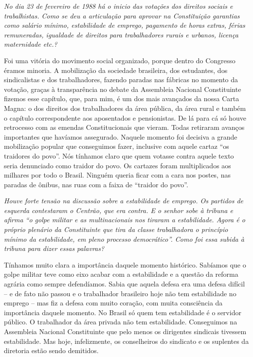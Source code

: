 \medskip

\noindent\emph{No dia 23 de fevereiro de 1988 há o inicio das votações dos
direitos sociais e trabalhistas. Como se deu a articulação para aprovar
na Constituição garantias como salário mínimo, estabilidade de emprego,
pagamento de horas extras, férias remuneradas, igualdade de direitos
para trabalhadores rurais e urbanos, licença maternidade etc.?}

Foi uma vitória do movimento social organizado, porque
dentro do Congresso éramos minoria. A mobilização da sociedade
brasileira, dos estudantes, dos sindicalistas e dos trabalhadores,
fazendo paradas nas fábricas no momento da votação, graças à
transparência no debate da Assembleia Nacional Constituinte fizemos esse
capítulo, que, para mim, é um dos mais avançados da nossa Carta Magna: o
dos direitos dos trabalhadores da área pública, da área rural e também o
capítulo correspondente aos aposentados e pensionistas. De lá para cá só
houve retrocesso com as emendas Constitucionais que vieram. Todas
retiraram avanços importantes que havíamos assegurado. Naquele momento
foi decisiva a grande mobilização popular que conseguimos fazer,
inclusive com aquele cartaz ``os traidores do povo''. Nós tínhamos claro
que quem votasse contra aquele texto seria denunciado como traidor do
povo. Os cartazes foram multiplicados aos milhares por todo o Brasil.
Ninguém queria ficar com a cara nos postes, nas paradas de ônibus, nas
ruas com a faixa de ``traidor do povo''.

\medskip

\noindent\emph{Houve forte tensão na discussão sobre a estabilidade de emprego.
Os partidos de esquerda contestaram o Centrão, que era contra. E o
senhor sobe à tribuna e afirma ``o golpe militar e as multinacionais nos
tiraram a estabilidade. Agora é o próprio plenário da Constituinte que
tira da classe trabalhadora o princípio mínimo da estabilidade, em pleno
processo democrático''. Como foi essa subida à tribuna para dizer essas
palavras?}

Tínhamos muito clara a importância daquele momento
histórico. Sabíamos que o golpe militar teve como eixo acabar com a
estabilidade e a questão da reforma agrária como sempre defendíamos.
Sabia que aquela defesa era uma defesa difícil -- e de fato não passou e
o trabalhador brasileiro hoje não tem estabilidade no emprego -- mas fiz
a defesa com muito coração, com muita consciência da importância daquele
momento. No Brasil só quem tem estabilidade é o servidor público. O
trabalhador da área privada não tem estabilidade. Conseguimos na
Assembleia Nacional Constituinte que pelo menos os dirigentes sindicais
tivessem estabilidade. Mas hoje, infelizmente, os conselheiros do
sindicato e os suplentes da diretoria estão sendo demitidos.

